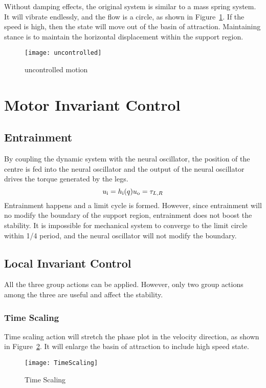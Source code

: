 Without damping effects, the original system is similar to a mass spring system.
It will vibrate endlessly, and the flow is a circle, as shown in Figure~\ref{fig:stancepostures}.
If the speed is high, then the state will move out of the basin of attraction.
Maintaining stance is to maintain the horizontal displacement within the support region.
\begin{figure}[!htbp]
  \begin{center}
     \texttt{[image: uncontrolled]}
    \caption{uncontrolled motion}
    \label{fig:stancepostures}
\end{center}
\end{figure}



\section {Motor Invariant Control}
\subsection{Entrainment}
By coupling the dynamic system with the neural oscillator, the position of the centre is fed into the neural oscillator and the output of the neural oscillator drives the torque generated by the legs.
\[
u_{\mathrm{i}}=h_{\mathrm{i}}(q)\\
u_{\mathrm{o}}=\tau_{L,R}
\]
Entrainment happens and a limit cycle is formed.
However, since entrainment will no modify the boundary of the support region, entrainment does not boost the stability. 
It is impossible for mechanical system to converge to the limit circle within 1/4 period, and the neural oscillator will not modify the boundary.

\subsection{Local Invariant Control}
All the three group actions can be applied.
However, only two group actions among the three are useful and affect the stability.
\subsubsection*{Time Scaling}
Time scaling action will stretch the phase plot in the velocity direction, as shown in Figure~\ref{fig:stanceTimeScaling}.
It will enlarge the basin of attraction to include high speed state.
\begin{figure}[!htbp]
  \begin{center}
      \texttt{[image: TimeScaling]}
    \caption{Time Scaling}
    \label{fig:stanceTimeScaling}
\end{center}
\end{figure}



